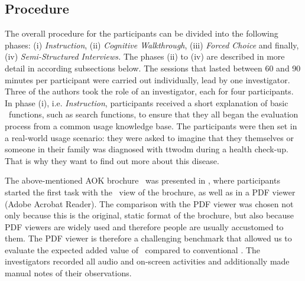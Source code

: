 \subsection{Procedure} \label{sec:procedure}
 The overall procedure for the participants can be divided into the following phases: 
 (i) \emph{Instruction}, 
 (ii) \emph{Cognitive Walkthrough}, 
 (iii) \emph{Forced Choice} and finally, 
 (iv) \emph{Semi-Structured Interviews.} 
 The phases (ii) to (iv) are described in more detail in according subsections below. 
 The sessions that lasted between 60 and 90 minutes per participant were carried out individually, lead by one investigator. 
 Three of the authors took the role of an investigator, each for four participants. 
 In phase (i), i.e. \emph{Instruction}, participants received a short explanation of basic \chis\ functions, such as search functions, to ensure that they all began the evaluation process from a common usage knowledge base. 
 The participants were then set in a real-world usage scenario: they were asked to imagine that they themselves or someone in their family was diagnosed with \acrshort{ttwodm} during a health check-up. 
 That is why they want to find out more about this disease.
 
 

The above-mentioned AOK brochure~\cite{aok} was presented in \apluschis, where participants started the first task with the \toc\ view of the brochure, as well as in a PDF viewer (Adobe Acrobat Reader). 
%
The comparison with the PDF viewer was chosen not only because this is the original, static format of the brochure, but also because PDF viewers are widely used and therefore people are usually accustomed to them. 
%
The PDF viewer is therefore a challenging benchmark that allowed us to evaluate the expected added value of \apluschis\ compared to conventional \chis. 
%
The investigators recorded all audio and on-screen activities and additionally made manual notes of their observations. 



